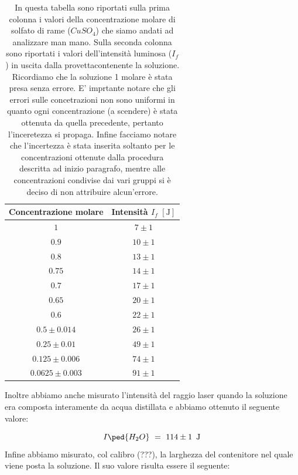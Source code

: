 \begin{table}[t!]
    \centering
    \begin{tabular}{c c }
        \toprule
         Concentrazione molare & Intensità $I_f \,\, [\si{\joule}]$ \\
        \midrule
		$1$ 	& $7 \pm 1$ \\
		$0.9$ 	& $10 \pm 1$ \\       
        $0.8$ 	& $13 \pm 1$ \\
        $0.75$ 	& $14 \pm 1$ \\
        $0.7$ 	& $17 \pm 1$ \\
        $0.65$ 	& $20 \pm 1$ \\
        $0.6$ 	& $22 \pm 1$ \\
        $0.5 \pm 0.014$ 	& $26 \pm 1$ \\
        $0.25 \pm 0.01$ 	& $49 \pm 1$ \\
        $0.125 \pm 0.006$ & $74 \pm 1$ \\
        $0.0625 \pm 0.003$ & $91 \pm 1$ \\
        \bottomrule
    \end{tabular}
    \caption{In questa tabella sono riportati sulla prima colonna i valori della concentrazione molare di solfato di rame ($CuSO_4$) che siamo andati ad analizzare man mano. Sulla seconda colonna sono riportati i valori dell'intensità luminosa ($I_f$) in uscita dalla provettacontenente la soluzione. Ricordiamo che la soluzione 1 molare è stata presa senza errore. E' imprtante notare che gli errori sulle concetrazioni non sono uniformi in quanto ogni concentrazione (a scendere) è stata ottenuta da quella precedente, pertanto l'inceretezza si propaga. Infine facciamo notare che l'incertezza è stata inserita soltanto per le concentrazioni ottenute dalla procedura descritta ad inizio paragrafo, mentre alle concentrazioni condivise dai vari gruppi si è deciso di non attribuire alcun'errore.}
    \label{tab:dati}
\end{table}
%
Inoltre abbiamo anche misurato l'intensità del raggio laser quando la soluzione era composta interamente da acqua distillata e abbiamo ottenuto il seguente valore:

\begin{equation}
	I\ped{H_2O} \,\,=\,\, 114 \pm 1 \,\,\, \si{\joule}
	\label{eq:acqua}
\end{equation}
%
Infine abbiamo misurato, col calibro (???), la larghezza del contenitore nel quale viene posta la soluzione. Il suo valore risulta essere il seguente:


